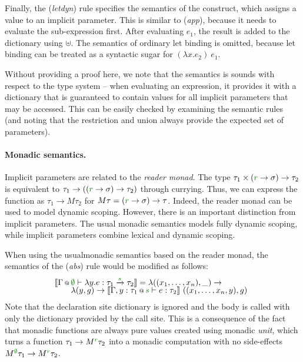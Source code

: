 Finally, the (\emph{letdyn}) rule specifies the semantics of the  construct, which 
assigns a value to an implicit parameter. This is similar to (\emph{app}), because it needs to 
evaluate the sub-expression first. After evaluating $e_1$, the result is added to the dictionary
using $\uplus$. The semantics of ordinary let binding is omitted, because let binding can be 
treated as a syntactic sugar for $(\lambda x.e_2)~e_1$.

Without providing a proof here, we note that the semantics is sounds with respect to the type 
system -- when evaluating an expression, it provides it with a dictionary that is guaranteed to
contain values for all implicit parameters that may be accessed. This can be easily checked by
examining the semantic rules (and noting that the restriction and union always provide the
expected set of parameters).

\paragraph{Monadic semantics.}
Implicit parameters are related to the \emph{reader mo\-nad}. The type 
$\tau_1 \times (\cclrd{r} \rightarrow \sigma) \rightarrow \tau_2$ is equivalent to
$\tau_1 \rightarrow ((\cclrd{r} \rightarrow \sigma) \rightarrow \tau_2)$ through currying. Thus, we can
express the function as $\tau_1 \rightarrow M\tau_2$ for $M\tau = (\cclrd{r} \rightarrow \sigma) \rightarrow \tau$.
Indeed, the reader monad can be used to model dynamic scoping. However, there is an important distinction
from implicit parameters. The usual monadic semantics models fully dynamic scoping, while implicit
parameters combine lexical and dynamic scoping.

When using the usualmonadic semantics based on the reader monad, the semantics of the (\emph{abs})
rule would be modified as follows:
%
\begin{equation*}
\hspace{-0.5em}
\begin{array}{l}
  \sem{\coctx{\Gamma}{\cclrd{\emptyset}} \vdash \lambda y. e : \tau_1 \xrightarrow{\cclrd{s}} \tau_2 } = 
      \lambda ((x_1, \ldots, x_n), \_) \rightarrow\\[-0.25em]
  \qquad\lambda (y, g) \rightarrow \sem{ \coctx{\Gamma,y:\tau_1}{\cclrd{s}} \vdash e : \tau_2 }~((x_1, \ldots, x_n, y), g)      
\end{array}
\end{equation*}
%
Note that the declaration site dictionary
is ignored and the body is called with only the dictionary provided by the call site. This is
a consequence of the fact that monadic functions are always pure values created using monadic
\emph{unit}, which turns a function $\tau_1 \rightarrow \mtyp{\cclrd{r}}{\tau_2}$ into a monadic
computation with no side-effects $\mtyp{\cclrd{\emptyset}}{\tau_1 \rightarrow \mtyp{\cclrd{r}}{\tau_2}}$.

